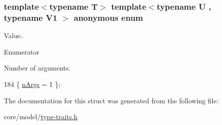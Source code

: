 \subsubsection[{\texorpdfstring{anonymous enum}{anonymous enum}}]{\setlength{\rightskip}{0pt plus 5cm}template$<$typename T$>$ template$<$typename U , typename V1 $>$ anonymous enum}\hypertarget{structTypeTraits_1_1FunctionPtrTraits_3_01U_07_5_08_07V1_08_4_adc4b37e57c5ca209d20bb7e7a10b34be}{}\label{structTypeTraits_1_1FunctionPtrTraits_3_01U_07_5_08_07V1_08_4_adc4b37e57c5ca209d20bb7e7a10b34be}
Value. \begin{Desc}
\item[Enumerator]\par
\begin{description}
\item[{\em 
n\+Args\hypertarget{structTypeTraits_1_1FunctionPtrTraits_3_01U_07_5_08_07V1_08_4_adc4b37e57c5ca209d20bb7e7a10b34bea50e90749608f026fd2bbd4167c733422}{}\label{structTypeTraits_1_1FunctionPtrTraits_3_01U_07_5_08_07V1_08_4_adc4b37e57c5ca209d20bb7e7a10b34bea50e90749608f026fd2bbd4167c733422}
}]Number of arguments. \end{description}
\end{Desc}

\begin{DoxyCode}
184 \{ \hyperlink{structTypeTraits_1_1FunctionPtrTraits_3_01U_07_5_08_07V1_08_4_adc4b37e57c5ca209d20bb7e7a10b34bea50e90749608f026fd2bbd4167c733422}{nArgs} = 1                \};
\end{DoxyCode}


The documentation for this struct was generated from the following file\+:\begin{DoxyCompactItemize}
\item 
core/model/\hyperlink{type-traits_8h}{type-\/traits.\+h}\end{DoxyCompactItemize}
